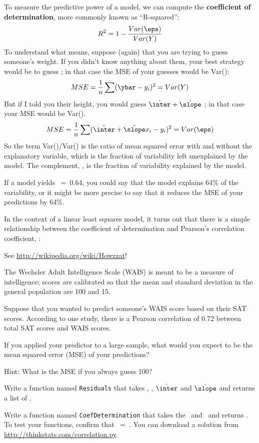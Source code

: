 \documentclass[12pt]{book}
\begin{document}
To measure the predictive power of a model, we can compute the {\bf
  coefficient of determination}, more commonly known as ``R-squared'':
%
\[ R^2 = 1 - \frac{Var(\eps)}{Var(Y)}\]
%
To understand what \R{} means, suppose (again) that you are trying
to guess someone's weight.  If you didn't know anything about them,
your best strategy would be to guess \myybar; in
that case the MSE of your guesses would be Var(\Y):
%
\[ MSE = \frac{1}{n} \sum (\ybar - y_i)^2 = Var(Y) \]
%
But if I told you their height, you would guess $\hat{\inter} +
\hat{\slope}$ \x{}; in that case your MSE would be Var(\myeps).
%
\[ MSE = 
\frac{1}{n} \sum (\hat{\inter} + \hat{\slope} x_i - y_i)^2 =
Var(\eps) \]
%
So the term Var(\myeps)/Var(\Y) is the ratio of mean squared error with
and without the explanatory variable, which is the fraction of
variability left unexplained by the model.  The complement, \R{},
is the fraction of variability explained by the model.

If a model yields \R{}~=~0.64, you could say that the model explains
64\% of the variability, or it might be more precise to say that it
reduces the MSE of your predictions by 64\%.

In the context of a linear least squares model, it turns out that
there is a simple relationship between the coefficient of
determination and Pearson's correlation coefficient, \myrho:


See \url{http://wikipedia.org/wiki/Howzzat}!

\begin{exercise}
The Wechsler Adult Intelligence Scale (WAIS) is meant to be a measure
of intelligence; scores are calibrated so that the mean and standard
deviation in the general population are 100 and 15.

Suppose that you wanted to predict someone's WAIS score based on their
SAT scores.  According to one study, there is a Pearson correlation of
0.72 between total SAT scores and WAIS scores.

If you applied your predictor to a large sample, what would you expect to
be the mean squared error (MSE) of your predictions?

Hint: What is the MSE if you always guess 100?
\end{exercise}


\begin{exercise}
Write a function named {\tt Residuals} that takes \X, \Y, $\hat{\inter}$
and $\hat{\slope}$ and returns a list of \myeps{}.

Write a function named {\tt CoefDetermination} that takes the 
\myeps{}~and \Y~and returns \R{}.  To test your functions, 
confirm that {\R{}~=~\myrho{}}.  You can download a solution
from \url{http://thinkstats.com/correlation.py}.

\end{exercise}
\end{document}

